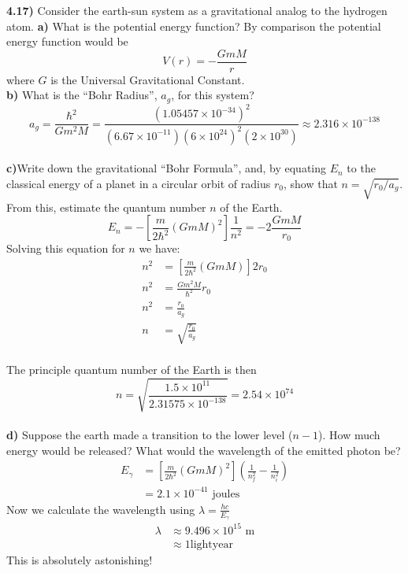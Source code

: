 \documentclass{scrartcl}
\begin{document}
\textbf{4.17)} Consider the earth-sun system as a gravitational analog to the hydrogen atom.
\textbf{a)} What is the potential energy function?
By comparison the potential energy function would be
\begin{displaymath}
V(r)=-\frac{GmM}{r}
\end{displaymath}
where $G$ is the Universal Gravitational Constant.
\\
\textbf{b)} What is the ``Bohr Radius'', $a_g$, for this system?
\begin{displaymath}
a_g=\frac{\hbar^2}{Gm^2M}=\frac{(1.05457\times10^{-34})^2}{(6.67\times10^{-11})(6\times10^{24})^2(2\times10^{30})}\approx 2.316\times10^{-138}
\end{displaymath}
\\
\textbf{c)}Write down the gravitational ``Bohr Formula'', and, by equating $E_n$ to the classical energy of a planet in a circular orbit of radius $r_0$, show that $n=\sqrt{r_0/a_g}$. From this, estimate the quantum number $n$ of the Earth.
\begin{displaymath}
E_n=-\left[\frac{m}{2\hbar^2}\left(GmM\right)^2\right]\frac{1}{n^2}=-2\frac{GmM}{r_0}
\end{displaymath}
Solving this equation for $n$ we have:
\begin{align*}
n^2&=\left[\frac{m}{2\hbar^2}\left(GmM\right)\right]2r_0\\
n^2&=\frac{Gm^2M}{\hbar^2}r_0\\
n^2&=\frac{r_0}{a_g}\\
n&=\sqrt{\frac{r_0}{a_g}}
\end{align*}
\\
The principle quantum number of the Earth is then
\begin{displaymath}
n=\sqrt{\frac{1.5\times10^{11}}{2.31575\times10^{-138}}}=2.54\times10^{74}
\end{displaymath}
\\
\textbf{d)} Suppose the earth made a transition to the lower level ($n-1$). How much energy would be released? What would the wavelength of the emitted photon be?\\

\begin{align*}
E_\gamma&=\left[\frac{m}{2\hbar^2}\left(GmM\right)^2\right]\left(\frac{1}{n_f^2}-\frac{1}{n_i^2}\right)\\
&=2.1\times10^{-41} \text{ joules}
\end{align*}
Now we calculate the wavelength using $\lambda=\frac{hc}{E_\gamma}$
\begin{align*}
\lambda&\approx 9.496\times10^{15} \text{ m}\\
&\approx 1 \text{lightyear}
\end{align*}
This is absolutely astonishing!
\end{document}
